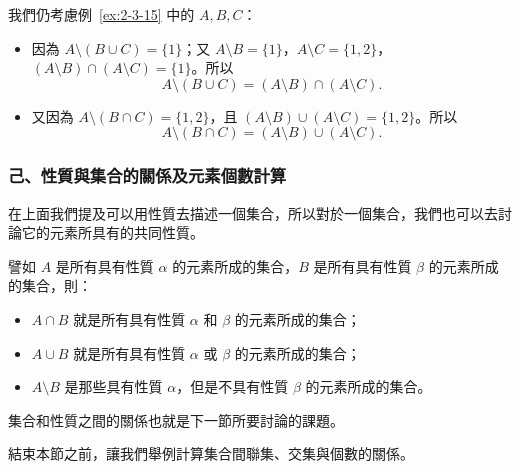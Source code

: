 \begin{enumerate}[(i)]
  \begin{example}\label{ex:2-3-16}
  我們仍考慮例~\ref{ex:2-3-15} 中的 $A, B, C$：
  \begin{itemize}
    \item 因為 $A \setminus (B \cup C) = \{1\}$；又 $A \setminus B = \{1\}$，$A \setminus C = \{1, 2\}$，$(A \setminus B) \cap (A \setminus C) = \{1\}$。所以
    \begin{equation*}
      A \setminus (B \cup C) = (A \setminus B) \cap (A \setminus C).
    \end{equation*}
    \item 又因為 $A \setminus (B \cap C) = \{1, 2\}$，且 $(A \setminus B) \cup (A \setminus C) = \{1, 2\}$。所以
    \begin{equation*}
      A \setminus (B \cap C) = (A \setminus B) \cup (A \setminus C).
    \end{equation*}
  \end{itemize}
  \end{example}
\end{enumerate}

\subsubsection*{己、性質與集合的關係及元素個數計算}\label{subsec:2-3-f}

在上面我們提及可以用性質去描述一個集合，所以對於一個集合，我們也可以去討論它的元素所具有的共同性質。

譬如 $A$ 是所有具有性質 $\alpha$ 的元素所成的集合，$B$ 是所有具有性質 $\beta$ 的元素所成的集合，則：
\begin{itemize}
  \item $A \cap B$ 就是所有具有性質 $\alpha$ 和 $\beta$ 的元素所成的集合；
  \item $A \cup B$ 就是所有具有性質 $\alpha$ 或 $\beta$ 的元素所成的集合；
  \item $A \setminus B$ 是那些具有性質 $\alpha$，但是不具有性質 $\beta$ 的元素所成的集合。
\end{itemize}
集合和性質之間的關係也就是下一節所要討論的課題。

結束本節之前，讓我們舉例計算集合間聯集、交集與個數的關係。

